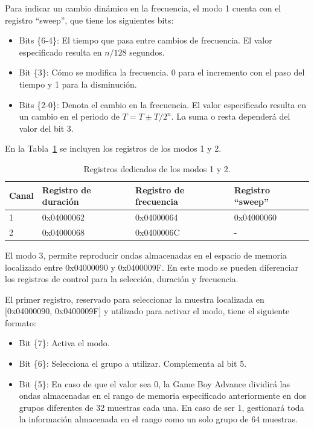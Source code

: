 Para indicar un cambio dinámico en la frecuencia, el modo 1 cuenta con el registro ``sweep'', que tiene los siguientes bits:

\begin{itemize}
	\item Bits \{6-4\}: El tiempo que pasa entre cambios de frecuencia. El valor especificado resulta en $n/128$ segundos.
	\item Bit \{3\}: Cómo se modifica la frecuencia. 0 para el incremento con el paso del tiempo y 1 para la disminución.
	\item Bits \{2-0\}: Denota el cambio en la frecuencia. El valor especificado resulta en un cambio en el periodo de $T=T\pm{}T/2^n$. La suma o resta dependerá del valor del bit {3}.
\end{itemize}

En la Tabla~\ref{tab:reg_canal_1_2} se incluyen los registros de los modos 1 y 2.

\begin{table}[h]
	\centering
	\begin{tabular}{| l | l | l | l |}
		\hline
		\textbf{Canal} & \textbf{Registro de duración} & \textbf{Registro de frecuencia} & \textbf{Registro ``sweep''} \\ \hline
		1 & 0x04000062 & 0x04000064 & 0x04000060 \\ \hline
		2 & 0x04000068 & 0x0400006C & - \\ \hline
	\end{tabular}
	\caption{Registros dedicados de los modos 1 y 2.}\label{tab:reg_canal_1_2}
\end{table}
\FloatBarrier{}

El modo 3, permite reproducir ondas almacenadas en el espacio de memoria localizado entre 0x04000090 y 0x0400009F. En este modo se pueden diferenciar los registros de control para la selección, duración y frecuencia.

El primer registro, reservado para seleccionar la muestra localizada en [0x04000090, 0x0400009F] y utilizado para activar el modo, tiene el siguiente formato:

\begin{itemize}
	\item Bit \{7\}: Activa el modo.
	\item Bit \{6\}: Selecciona el grupo a utilizar. Complementa al bit {5}.
	\item Bit \{5\}: En caso de que el valor sea 0, la Game Boy Advance dividirá las ondas almacenadas en el rango de memoria especificado anteriormente en dos grupos diferentes de 32 muestras cada una. En caso de ser 1, gestionará toda la información almacenada en el rango como un solo grupo de 64 muestras.
\end{itemize}

